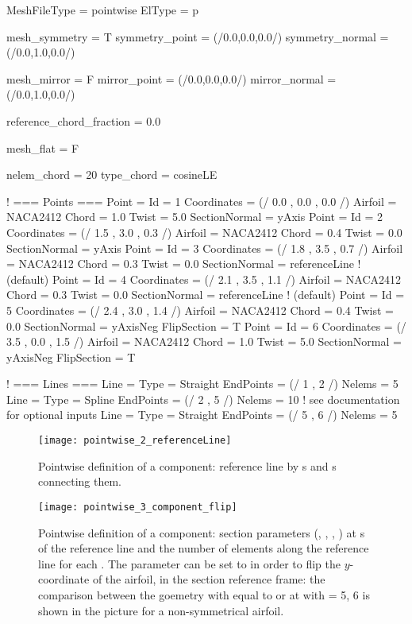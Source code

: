 \begin{inputfile}[frame=single, caption={''Pointwise'' geometry definition }, label={file:pointwise_example_file.in}]
MeshFileType = pointwise
ElType = p

mesh_symmetry = T
symmetry_point = (/0.0,0.0,0.0/)
symmetry_normal = (/0.0,1.0,0.0/)

mesh_mirror = F
mirror_point = (/0.0,0.0,0.0/)
mirror_normal = (/0.0,1.0,0.0/)

reference_chord_fraction = 0.0

mesh_flat = F

nelem_chord = 20
type_chord = cosineLE

! === Points ===
Point = {
  Id = 1
  Coordinates = (/ 0.0 , 0.0 , 0.0 /)
  Airfoil = NACA2412
  Chord = 1.0
  Twist = 5.0
  SectionNormal = yAxis
}
Point = {
  Id = 2
  Coordinates = (/ 1.5 , 3.0 , 0.3 /)
  Airfoil = NACA2412
  Chord = 0.4
  Twist = 0.0
  SectionNormal = yAxis
}
Point = {
  Id = 3
  Coordinates = (/ 1.8 , 3.5 , 0.7 /)
  Airfoil = NACA2412
  Chord = 0.3
  Twist = 0.0
  SectionNormal = referenceLine ! (default)
}
Point = {
  Id = 4
  Coordinates = (/ 2.1 , 3.5 , 1.1 /)
  Airfoil = NACA2412
  Chord = 0.3
  Twist = 0.0
  SectionNormal = referenceLine ! (default)
}
Point = {
  Id = 5
  Coordinates = (/ 2.4 , 3.0 , 1.4 /)
  Airfoil = NACA2412
  Chord = 0.4
  Twist = 0.0
  SectionNormal = yAxisNeg
  FlipSection = T
}
Point = {
  Id = 6
  Coordinates = (/ 3.5 , 0.0 , 1.5 /)
  Airfoil = NACA2412
  Chord = 1.0
  Twist = 5.0
  SectionNormal = yAxisNeg
  FlipSection = T
}

! === Lines ===
Line = {
  Type = Straight
  EndPoints = (/ 1 , 2 /)
  Nelems = 5
}
Line = {
  Type = Spline
  EndPoints = (/ 2 , 5 /)
  Nelems = 10
  ! see documentation for optional inputs
}
Line = {
  Type = Straight
  EndPoints = (/ 5 , 6 /)
  Nelems = 5
}

\end{inputfile}
%
\begin{figure}[h!]
\centering
\texttt{[image: pointwise\_2\_referenceLine]}
    \caption{Pointwise definition of a component: reference line by s and s connecting them.}
\label{fig:pointwise_reference_line}
\end{figure}
%
\begin{figure}[h!]
\centering
\texttt{[image: pointwise\_3\_component\_flip]}
    \caption{Pointwise definition of a component: section parameters (, , , ) at s of the reference line and the number  of elements along the reference line for each . The parameter  can be set to  in order to flip the $y$-coordinate of the airfoil, in the section reference frame: the comparison between the goemetry with  equal to  or   at  with  = 5, 6 is shown in the picture for a non-symmetrical airfoil.}
\label{fig:pointwise_component}
\end{figure}


